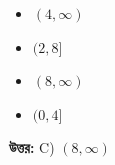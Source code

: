 \documentclass[12pt, a4paper]{article}
\begin{document}
\begin{itemize}[label={}, leftmargin=1cm, itemsep=0.5em]
    \item[\textbf{A)}] $(4, \infty)$
    \item[\textbf{B)}] $(2, 8]$
    \item[\textbf{C)}] $(8, \infty)$
    \item[\textbf{D)}] $(0, 4]$
\end{itemize}

\vspace{0.5em}
\begin{tcolorbox}[answerbox]
    \textbf{\color{success} উত্তর:} C) $(8, \infty)$
\end{tcolorbox}
\vspace{1em}
\end{document}
